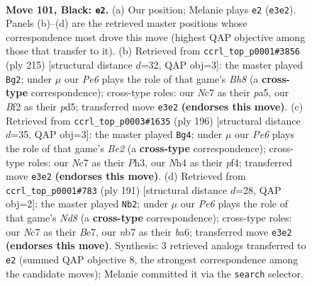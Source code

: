 \documentclass[11pt]{article}
\begin{document}
\clearpage

\begin{figure}[p]\centering
\begin{subfigure}{0.46\textwidth}\centering
\resizebox{\linewidth}{!}{%
\newchessgame
\chessboard[
  setfen={8/1Nn3k1/8/8/Pp2P2n/1B2p3/2K2b1p/8 b - - 11 101},
  showmover=false,
  pgfstyle=straightmove, color=movearrow, markmove={e3-e2}
]}
\caption{}
\end{subfigure}\hfill
\begin{subfigure}{0.46\textwidth}\centering
\resizebox{\linewidth}{!}{%
\newchessgame
\chessboard[
  setfen={3k4/8/p7/P2PB3/3K4/5p2/5P2/7b b - - 27 108},
  showmover=false,
  pgfstyle=straightmove, color=movearrow, markmove={h1-g2}
]}
\caption{}
\end{subfigure}
\\[4pt]
\begin{subfigure}{0.46\textwidth}\centering
\resizebox{\linewidth}{!}{%
\newchessgame
\chessboard[
  setfen={8/8/8/bP6/5p1p/2k4P/4B1P1/2K5 w - - 72 99},
  showmover=false,
  pgfstyle=straightmove, color=movearrow, markmove={e2-g4}
]}
\caption{}
\end{subfigure}\hfill
\begin{subfigure}{0.46\textwidth}\centering
\resizebox{\linewidth}{!}{%
\newchessgame
\chessboard[
  setfen={8/4b3/B6B/3k4/1p5p/5K2/2P3P1/3n4 b - - 90 96},
  showmover=false,
  pgfstyle=straightmove, color=movearrow, markmove={d1-b2}
]}
\caption{}
\end{subfigure}
\caption{\textbf{Move 101, Black: \texttt{e2}.} (a) Our position; Melanie plays \texttt{e2} (\texttt{e3e2}). Panels (b)--(d) are the retrieved master positions whose correspondence most drove this move (highest QAP objective among those that transfer to it). (b) Retrieved from \texttt{ccrl\_top\_p0001\#3856} (ply 215) [structural distance $d$=32, QAP obj=3]: the master played \texttt{Bg2}; under $\mu$ our \emph{Pe6} plays the role of that game's \emph{Bh8} (a \textbf{cross-type} correspondence); cross-type roles: our \emph{N}c7 as their \emph{p}a5, our \emph{B}f2 as their \emph{p}d5; transferred move \texttt{e3e2} \textbf{(endorses this move)}. (c) Retrieved from \texttt{ccrl\_top\_p0003\#1635} (ply 196) [structural distance $d$=35, QAP obj=3]: the master played \texttt{Bg4}; under $\mu$ our \emph{Pe6} plays the role of that game's \emph{Be2} (a \textbf{cross-type} correspondence); cross-type roles: our \emph{N}c7 as their \emph{P}h3, our \emph{N}h4 as their \emph{p}f4; transferred move \texttt{e3e2} \textbf{(endorses this move)}. (d) Retrieved from \texttt{ccrl\_top\_p0001\#783} (ply 191) [structural distance $d$=28, QAP obj=2]: the master played \texttt{Nb2}; under $\mu$ our \emph{Pe6} plays the role of that game's \emph{Nd8} (a \textbf{cross-type} correspondence); cross-type roles: our \emph{N}c7 as their \emph{B}e7, our \emph{n}b7 as their \emph{b}a6; transferred move \texttt{e3e2} \textbf{(endorses this move)}. Synthesis: 3 retrieved analogs transferred to \texttt{e2} (summed QAP objective 8, the strongest correspondence among the candidate moves); Melanie committed it via the \texttt{search} selector.}
\label{fig:thought-m201}
\end{figure}
\end{document}
